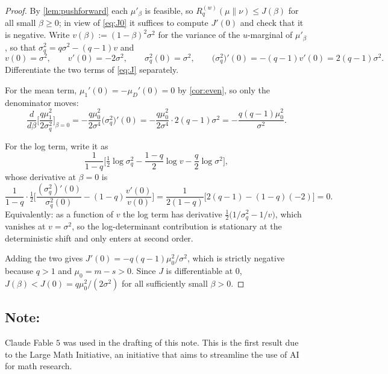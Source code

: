 \documentclass[11pt,reqno]{amsart}
\theoremstyle{definition}
\theoremstyle{remark}
\def\half{{\tfrac12}}
\numberwithin{equation}{section}
\begin{document}
\begin{proof}
By \cref{lem:pushforward} each $\mu'_\beta$ is feasible, so $R^{(w)}_q(\mu\|\nu)\le J(\beta)$ for all small $\beta\ge0$; in view of \eqref{eq:J0} it suffices to compute $J'(0)$ and check that it is negative. Write $v(\beta):=(1-\beta)^2\sigma^2$ for the variance of the $u$-marginal of $\mu'_\beta$, so that $\sigma_q^2=q\sigma^2-(q-1)v$ and
$$v(0)=\sigma^2,\qquad v'(0)=-2\sigma^2,\qquad \sigma_q^2(0)=\sigma^2,\qquad \big(\sigma_q^2\big)'(0)=-(q-1)v'(0)=2(q-1)\sigma^2.$$
Differentiate the two terms of \eqref{eq:J} separately.

For the mean term, $\mu_1'(0)=-\mu_D'(0)=0$ by \cref{cor:even}, so only the denominator moves:
$$\frac{d}{d\beta}\bigg[\frac{q\mu_1^2}{2\sigma_q^2}\bigg]_{\beta=0}=-\frac{q\mu_0^2}{2\sigma^4}\big(\sigma_q^2\big)'(0)=-\frac{q\mu_0^2}{2\sigma^4}\cdot 2(q-1)\sigma^2=-\frac{q(q-1)\mu_0^2}{\sigma^2}.$$

For the log term, write it as
$$\frac{1}{1-q}\bigg[\half\log\sigma_q^2-\frac{1-q}{2}\log v-\frac{q}{2}\log\sigma^2\bigg],$$
whose derivative at $\beta=0$ is
$$\frac{1}{1-q}\cdot\half\bigg[\frac{(\sigma_q^2)'(0)}{\sigma_q^2(0)}-(1-q)\frac{v'(0)}{v(0)}\bigg]
=\frac{1}{2(1-q)}\Big[2(q-1)-(1-q)(-2)\Big]=0.$$
Equivalently: as a function of $v$ the log term has derivative $\half\big(1/\sigma_q^2-1/v\big)$, which vanishes at $v=\sigma^2$, so the log-determinant contribution is stationary at the deterministic shift and only enters at second order.

Adding the two gives $J'(0)=-q(q-1)\mu_0^2/\sigma^2$, which is strictly negative because $q>1$ and $\mu_0=m-s>0$. Since $J$ is differentiable at $0$, $J(\beta)<J(0)=q\mu_0^2/(2\sigma^2)$ for all sufficiently small $\beta>0$.
\end{proof}

\subsection*{Note:}
Claude Fable $5$ was used in the drafting of this note. This is the first result due to the Large Math Initiative, an initiative that aims to streamline the use of AI for math research.



\end{document}
